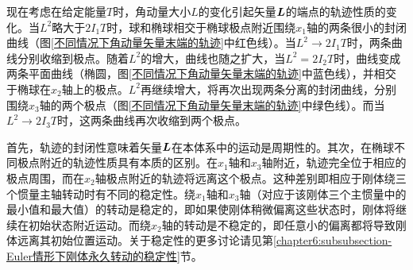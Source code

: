 现在考虑在给定能量$T$时，角动量大小$L$的变化引起矢量$\boldsymbol{L}$的端点的轨迹性质的变化。当$L^2$略大于$2I_1T$时，球和椭球相交于椭球极点附近围绕$x_1$轴的两条很小的封闭曲线（图\ref{不同情况下角动量矢量末端的轨迹}中红色线）。当$L^2\to 2I_1T$时，两条曲线分别收缩到极点。随着$L^2$的增大，曲线也随之扩大，当$L^2=2I_2T$时，曲线变成两条平面曲线（椭圆，图\ref{不同情况下角动量矢量末端的轨迹}中蓝色线），并相交于椭球在$x_2$轴上的极点。$L^2$再继续增大，将再次出现两条分离的封闭曲线，分别围绕$x_3$轴的两个极点（图\ref{不同情况下角动量矢量末端的轨迹}中绿色线）。而当$L^2\to 2I_3T$时，这两条曲线再次收缩到两个极点。

首先，轨迹的封闭性意味着矢量$\boldsymbol{L}$在本体系中的运动是周期性的。其次，在椭球不同极点附近的轨迹性质具有本质的区别。在$x_1$轴和$x_3$轴附近，轨迹完全位于相应的极点周围，而在$x_2$轴极点附近的轨迹将远离这个极点。这种差别即相应于刚体绕三个惯量主轴转动时有不同的稳定性。绕$x_1$轴和$x_3$轴（对应于该刚体三个主惯量中的最小值和最大值）的转动是稳定的，即如果使刚体稍微偏离这些状态时，刚体将继续在初始状态附近运动。而绕$x_2$轴的转动是不稳定的，即任意小的偏离都将导致刚体远离其初始位置运动。关于稳定性的更多讨论请见第\ref{chapter6:subsubsection-Euler情形下刚体永久转动的稳定性}节。

